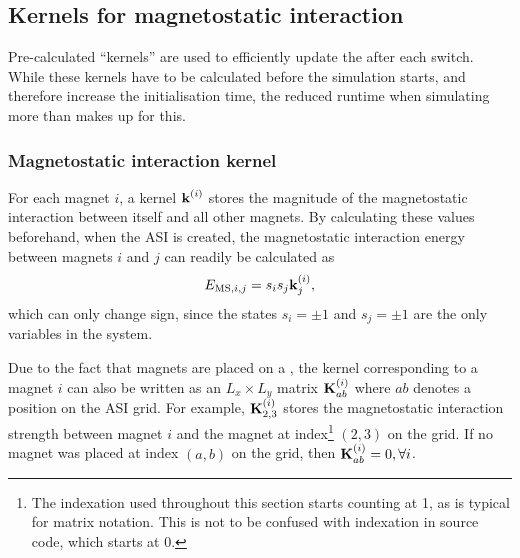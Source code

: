 \subsection{Kernels for magnetostatic interaction}\label{sec:2:Kernels}
Pre-calculated ``kernels'' are used to efficiently update the  after each switch. 
While these kernels have to be calculated before the simulation starts, and therefore increase the initialisation time, the reduced runtime when simulating  more than makes up for this.

\subsubsection{Magnetostatic interaction kernel}\label{sec:2:Kernels:Structure}
For each magnet $i$, a kernel $\boldsymbol{\mathbf{k}}^{(i)}$ stores the magnitude of the magnetostatic interaction between itself and all other magnets.
By calculating these values beforehand, when the ASI is created, the magnetostatic interaction energy between magnets $i$ and $j$ can readily be calculated as
\begin{equation}
	\label{eq:2:Kernel_k}
	E_{\mathrm{MS},i,j}= s_i s_j \boldsymbol{\mathbf{k}}^{(i)}_j \mathrm{,}
\end{equation}
which can only change sign, since the states $s_i = \pm 1$ and $s_j = \pm 1$ are the only variables in the system. \par
Due to the fact that magnets are placed on a , the kernel corresponding to a magnet $i$ can also be written as an $L_x \times L_y$ matrix $\boldsymbol{\mathbf{K}}^{(i)}_{ab}$ where $ab$ denotes a position on the ASI grid.
For example, $\boldsymbol{\mathbf{K}}^{(i)}_{2,3}$ stores the magnetostatic interaction strength between magnet $i$ and the magnet at index\footnote{
	The indexation used throughout this section starts counting at 1, as is typical for matrix notation.
	This is not to be confused with indexation in source code, which starts at 0.
} $(2,3)$ on the grid.
If no magnet was placed at index $(a,b)$ on the grid, then $\boldsymbol{\mathbf{K}}^{(i)}_{ab} = 0, \forall i$. \\\par


